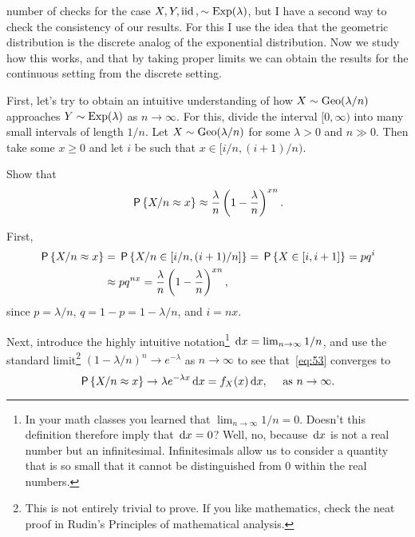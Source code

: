  number of checks for the case $X, Y, \iid, \sim\Exp{\lambda}$,
but I have a second way to check the  consistency of our results.
For this I use the idea that the geometric distribution is the discrete analog of the exponential distribution.
Now we study how this works, and that by taking proper limits we can obtain the results for the continuous setting from the discrete setting.

First, let's try to obtain an intuitive understanding of how $X\sim \Geo{\lambda/n}$ approaches  $Y\sim\Exp{\lambda}$ as $n\to\infty$.
For this, divide the interval $[0, \infty)$ into many small intervals of length $1/n$.
Let  $X\sim \Geo{\lambda/n}$ for some $\lambda>0$ and $n\gg 0$. Then take  some $x\geq 0$ and  let $i$ be such that $x\in[i/n, (i+1)/n)$.

\begin{exercise}
Show that
\begin{equation}\label{eq:53}
\P{X/n \approx x} \approx \frac{\lambda} n \left(1-\frac \lambda n\right)^{xn}.
\end{equation}
\begin{solution}
First,
\begin{align*}
\P{X/n \approx x} &= \P{X/n \in [i/n, (i+1)/n]} = \P{X \in [i, i+1]} = p q^{i} \\
&\approx p q^{n x} = \frac{\lambda} n \left(1-\frac \lambda n\right)^{xn},
\end{align*}
since $p=\lambda/n$, $q=1-p=1-\lambda/n$, and $i=nx$.
\end{solution}
\end{exercise}
Next,  introduce the highly intuitive notation\footnote{In your math classes you learned that $\lim_{n\to \infty} 1/n = 0$. Doesn't this definition therefore imply that $\d x = 0$? Well, no, because $\d x$ is not a real number but an infinitesimal. Infinitesimals allow us to consider a quantity that is so small that it cannot be distinguished from 0 within the real numbers.}  $\d x = \lim_{n\to \infty} 1/n$, and use the standard limit\footnote{This is not entirely trivial to prove. If you like mathematics, check the neat proof in Rudin's Principles of mathematical analysis.}  $(1-\lambda/n)^n\to e^{-\lambda}$ as $n\to\infty$ to see that~\cref{eq:53} converges to
\begin{equation*}
\P{X/n \approx x} \to \lambda e^{-\lambda x} \d x = f_{X}(x) \d x,\quad\text{ as } n \to \infty.
\end{equation*}

